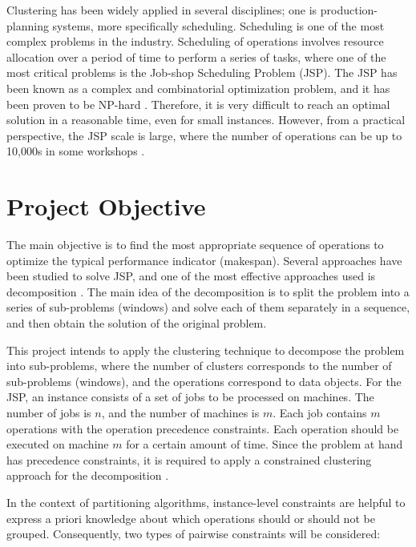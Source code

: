 \documentclass{article}
\newcommand{\comment}[1]{\todo[inline]{#1}}
\begin{document}
Clustering has been widely applied in several disciplines; one is production-planning systems, more specifically scheduling. 
\comment{Are there any citations for the claim above?}
Scheduling is one of the most complex problems in the industry. Scheduling of operations involves resource allocation over a period of time to perform a series of tasks, where one of the most critical problems is the Job-shop Scheduling Problem (JSP). The JSP has been known as a complex and combinatorial optimization problem, and it has been proven to be NP-hard \cite{baker1974introduction,lenstra1979computational}. Therefore, it is very difficult to reach an optimal solution in a reasonable time, even for small instances. However, from a practical perspective, the JSP scale is large, where the number of operations can be up to 10,000s in some workshops \cite{zhang2010hybrid}.

\section{Project Objective}
The main objective is to find the most appropriate sequence of operations to optimize the typical performance indicator (makespan). Several approaches have been studied to solve JSP, and one of the most effective approaches used is decomposition \cite{zhang2010hybrid,zhai2014decomposition}. The main idea of the decomposition is to split the problem into a series of sub-problems (windows) and solve each of them separately in a sequence, and then obtain the solution of the original problem.

This project intends to apply the clustering technique to decompose the problem into sub-problems, where the number of clusters corresponds to the number of sub-problems (windows), and the operations correspond to data objects. For the JSP, an instance consists of a set of jobs to be processed on machines. The number of jobs is $n$, and the number of machines is $m$. Each job contains $m$ operations with the operation precedence constraints. Each operation should be executed on machine $m$ for a certain amount of time. Since the problem at hand has precedence constraints, it is required to apply a constrained clustering approach for the decomposition \cite{wagstaff2001constrained}.

In the context of partitioning algorithms, instance-level constraints are helpful to express a priori knowledge about which operations should or should not be grouped. Consequently, two types of pairwise constraints will be considered:
\end{document}
